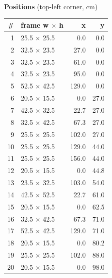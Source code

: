 \documentclass[a4paper,landscape,10pt]{article}
\begin{document}
\begin{minipage}[t]{0.25\textwidth}
\vspace{8pt}
{\bfseries Positions} (top-left corner, cm)\\[2pt]
\tiny
\begin{tabular}{@{}r l r r@{}}
\toprule
\# & frame w $\times$ h & x & y \\
\midrule
1 & 25.5 $\times$ 25.5 & 0.0 & 0.0 \\
2 & 32.5 $\times$ 23.5 & 27.0 & 0.0 \\
3 & 32.5 $\times$ 23.5 & 61.0 & 0.0 \\
4 & 32.5 $\times$ 23.5 & 95.0 & 0.0 \\
5 & 52.5 $\times$ 42.5 & 129.0 & 0.0 \\
6 & 20.5 $\times$ 15.5 & 0.0 & 27.0 \\
7 & 42.5 $\times$ 32.5 & 22.7 & 27.0 \\
8 & 32.5 $\times$ 42.5 & 67.3 & 27.0 \\
9 & 25.5 $\times$ 25.5 & 102.0 & 27.0 \\
10 & 25.5 $\times$ 25.5 & 129.0 & 44.0 \\
11 & 25.5 $\times$ 25.5 & 156.0 & 44.0 \\
12 & 20.5 $\times$ 15.5 & 0.0 & 44.8 \\
13 & 23.5 $\times$ 32.5 & 103.0 & 54.0 \\
14 & 42.5 $\times$ 52.5 & 22.7 & 61.0 \\
15 & 20.5 $\times$ 15.5 & 0.0 & 62.5 \\
16 & 32.5 $\times$ 42.5 & 67.3 & 71.0 \\
17 & 52.5 $\times$ 42.5 & 129.0 & 71.0 \\
18 & 20.5 $\times$ 15.5 & 0.0 & 80.2 \\
19 & 25.5 $\times$ 25.5 & 102.0 & 88.0 \\
20 & 20.5 $\times$ 15.5 & 0.0 & 98.0 \\
\bottomrule
\end{tabular}
\end{minipage}
\clearpage
\end{document}
